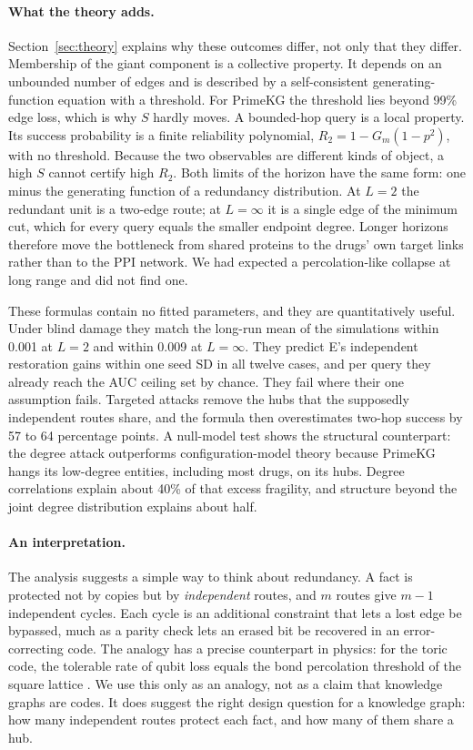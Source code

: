 \paragraph{What the theory adds.}
Section~\ref{sec:theory} explains why these outcomes differ, not only that they
differ. Membership of the giant component is a collective property. It depends
on an unbounded number of edges and is described by a self-consistent
generating-function equation with a threshold. For PrimeKG the threshold lies
beyond 99\% edge loss, which is why $S$ hardly moves. A bounded-hop query is a
local property. Its success probability is a finite reliability polynomial,
$R_2=1-G_m(1-p^2)$, with no threshold. Because the two observables are
different kinds of object, a high $S$ cannot certify high $R_2$. Both limits of
the horizon have the same form: one minus the generating function of a
redundancy distribution. At $L=2$ the redundant unit is a two-edge route; at
$L=\infty$ it is a single edge of the minimum cut, which for every query equals
the smaller endpoint degree. Longer horizons therefore move the bottleneck from
shared proteins to the drugs' own target links rather than to the PPI network.
We had expected a percolation-like collapse at long range and did not find one.

These formulas contain no fitted parameters, and they are quantitatively
useful. Under blind damage they match the long-run mean of the simulations
within 0.001 at $L=2$ and within 0.009 at $L=\infty$. They predict E's
independent restoration gains within one seed SD in all twelve cases, and per
query they already reach the AUC ceiling set by chance. They fail where their
one assumption fails. Targeted attacks remove the hubs that the supposedly
independent routes share, and the formula then overestimates two-hop success by
57 to 64 percentage points. A null-model test shows the structural counterpart:
the degree attack outperforms configuration-model theory because PrimeKG hangs
its low-degree entities, including most drugs, on its hubs. Degree correlations
explain about 40\% of that excess fragility, and structure beyond the joint
degree distribution explains about half.

\paragraph{An interpretation.}
The analysis suggests a simple way to think about redundancy. A fact is
protected not by copies but by \emph{independent} routes, and $m$ routes give
$m-1$ independent cycles. Each cycle is an additional constraint that lets a
lost edge be bypassed, much as a parity check lets an erased bit be recovered
in an error-correcting code. The analogy has a precise counterpart in physics:
for the toric code, the tolerable rate of qubit loss equals the bond percolation
threshold of the square lattice \cite{stace2009thresholds}. We use this only as
an analogy, not as a claim that knowledge graphs are codes. It does suggest the
right design question for a knowledge graph: how many independent routes
protect each fact, and how many of them share a hub.

